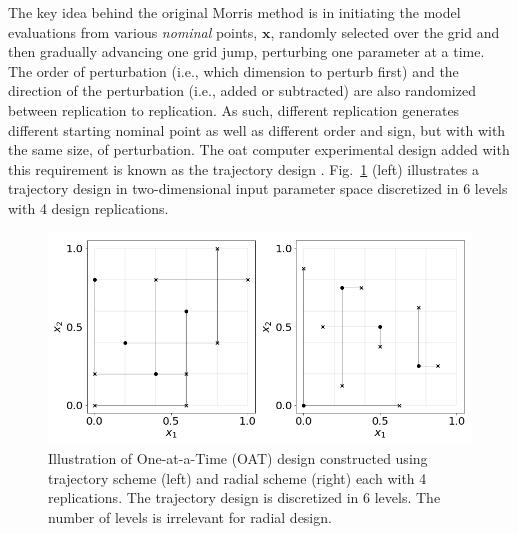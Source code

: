 The key idea behind the original Morris method is in initiating the model evaluations from various \textit{nominal} points, $\mathbf{x}$,
randomly selected over the grid and then gradually advancing one grid jump, perturbing one parameter at a time.
The order of perturbation (i.e., which dimension to perturb first) and the direction of the perturbation (i.e., added or subtracted) are also randomized between replication to replication.
As such, different replication generates different starting nominal point as well as different order and sign, but with with the same size, of perturbation.
The \gls{oat} computer experimental design added with this requirement is known as the trajectory design \cite{Ruano2012}.
Fig.~\ref{fig:illustrate_oat_design} (left) illustrates a trajectory design in two-dimensional input parameter space discretized in $6$ levels with 4 design replications.
\begin{figure}[bth]
	\centering
	\includegraphics[width=1.0\textwidth]{../figures/illustrateOATDesign/illustrateOATDesign.png}
	\caption[Illustration of One-at-a-Time (OAT) design using trajectory and radial schemes]{Illustration of One-at-a-Time (OAT) design constructed using trajectory scheme (left) and radial scheme (right) each with 4 replications. The trajectory design is discretized in 6 levels. The number of levels is irrelevant for radial design.}\label{fig:illustrate_oat_design}
\end{figure}

